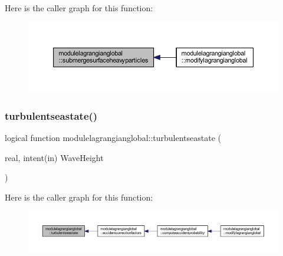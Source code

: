 Here is the caller graph for this function\+:\nopagebreak
\begin{figure}[H]
\begin{center}
\leavevmode
\includegraphics[width=350pt]{namespacemodulelagrangianglobal_ac3b09a7520aad0e3fd4d4778451773cc_icgraph}
\end{center}
\end{figure}
\mbox{\label{namespacemodulelagrangianglobal_a66539afef33f6cbf3d95ac82710bc7f9}} 
\subsubsection{\texorpdfstring{turbulentseastate()}{turbulentseastate()}}
{\footnotesize\ttfamily logical function modulelagrangianglobal\+::turbulentseastate (\begin{DoxyParamCaption}\item[{real, intent(in)}]{Wave\+Height }\end{DoxyParamCaption})\hspace{0.3cm}{\ttfamily [private]}}

Here is the caller graph for this function\+:\nopagebreak
\begin{figure}[H]
\begin{center}
\leavevmode
\includegraphics[width=350pt]{namespacemodulelagrangianglobal_a66539afef33f6cbf3d95ac82710bc7f9_icgraph}
\end{center}
\end{figure}
\mbox{\label{namespacemodulelagrangianglobal_a64f9a95bbf347c4a3b9599b01ab16129}} 

